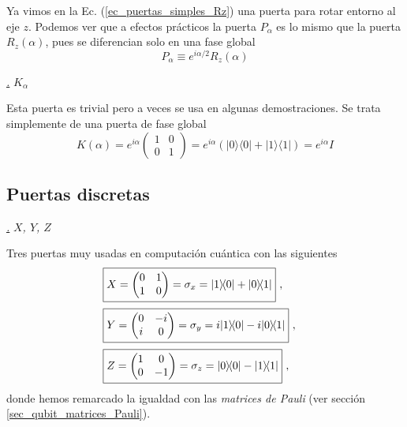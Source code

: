 \documentclass[a4paper,11pt]{book} %
\numberwithin{equation}{chapter}
\def\lp{\left(}
\def\rp{\right)}
\newcommand{\ketbra}[2]{| #1\rangle \! \langle #2|}
\def\subsubiContadorIt{\par\addtocounter{subsubsection}{1}\underline{\it\thesubsubsection.}\hskip0.5cm \setcounter{subsubsubsectionIt}{0}}
\newcommand{\SubsubiIt}[1]{
		\subsubiContadorIt \textit{#1}
	}
\newcounter{subsubsubsectionIt}[subsubsection]
\begin{document}
Ya vimos en la Ec. (\ref{ec_puertas_simples_Rz}) una puerta para rotar entorno al eje $z$. Podemos ver que a efectos prácticos la puerta $P_\alpha$ es lo mismo que la puerta $R_z(\alpha)$, pues se diferencian solo en una fase global
	\begin{equation*}
	P_\alpha \equiv e^{i \alpha/2} R_z (\alpha)
	\end{equation*}
		    
		    		    
		    \SubsubiIt{$K_\alpha$}  

Esta puerta es trivial pero a veces se usa en algunas demostraciones. Se trata simplemente de una puerta de fase global
	\begin{equation}
	K(\alpha)= e^{i\alpha} \lp \begin{matrix} 1 & 0 \\ 0 & 1 \end{matrix} \rp =  
	e^{i\alpha} \lp  \ketbra{0}{0} + \ketbra{1}{1} \right) = e^{i\alpha} I 
	\end{equation}
    	
        \subsection{Puertas discretas}
        
            \SubsubiIt{$X$, $Y$, $Z$}

Tres puertas muy usadas en computación cuántica con las siguientes
\begin{align}
&\boxed{X = \lp  \begin{matrix}0&1\\1&0\end{matrix} \rp = \sigma_x = \ketbra{1}{0} + \ketbra{0}{1}}~, ~~~  \label{ec_puertas_simples_X} \\ \rule{0mm}{7mm}
&\boxed{Y = \lp \begin{matrix}0&-i\\i&0\end{matrix} \rp = \sigma_y  =  i \ketbra{1}{0} - i \ketbra{0}{1}}~, ~~~ \label{ec_puertas_simples_Y}\\ \rule{0mm}{7mm}
&\boxed{Z = \lp  \begin{matrix}1&0\\0&-1\end{matrix} \rp = \sigma_z = \ketbra{0}{0} - \ketbra{1}{1}}  ~, ~~~ \label{ec_puertas_simples_Z}
\end{align}
donde hemos remarcado la igualdad con las \textit{matrices de Pauli} (ver sección \ref{sec_qubit_matrices_Pauli}).
\end{document}
